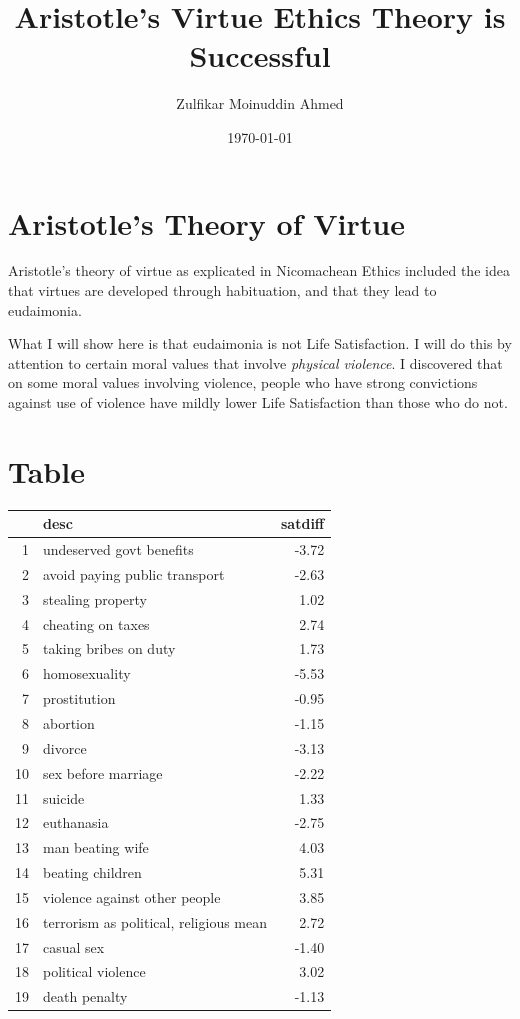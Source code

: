 \documentclass{amsart}
\title{Aristotle's Virtue Ethics Theory is Successful}
\author{Zulfikar Moinuddin Ahmed}
\date{\today}
\begin{document}
\maketitle

\section{Aristotle's Theory of Virtue}

Aristotle's theory of virtue as explicated in Nicomachean Ethics included the idea that virtues are developed through habituation, and that they lead to eudaimonia.

What I will show here is that eudaimonia is not Life Satisfaction.  I will do this by attention to certain moral values that involve {\em physical violence}.  I discovered that on some moral values involving violence, people who have strong convictions against use of violence have mildly lower Life Satisfaction than those who do not.

\section{Table}

\begin{table}[ht]
\centering
\begin{tabular}{rlr}
  \hline
 & desc & satdiff \\ 
  \hline
1 & undeserved govt benefits & -3.72 \\ 
  2 & avoid paying public transport & -2.63 \\ 
  3 & stealing property & 1.02 \\ 
  4 & cheating on taxes & 2.74 \\ 
  5 & taking bribes on duty & 1.73 \\ 
  6 & homosexuality & -5.53 \\ 
  7 & prostitution & -0.95 \\ 
  8 & abortion & -1.15 \\ 
  9 & divorce & -3.13 \\ 
  10 & sex before marriage & -2.22 \\ 
  11 & suicide & 1.33 \\ 
  12 & euthanasia & -2.75 \\ 
  13 & man beating wife & 4.03 \\ 
  14 & beating children & 5.31 \\ 
  15 & violence against other people & 3.85 \\ 
  16 & terrorism as political, religious mean & 2.72 \\ 
  17 & casual sex & -1.40 \\ 
  18 & political violence & 3.02 \\ 
  19 & death penalty & -1.13 \\ 
   \hline
\end{tabular}
\end{table}
\end{document}
